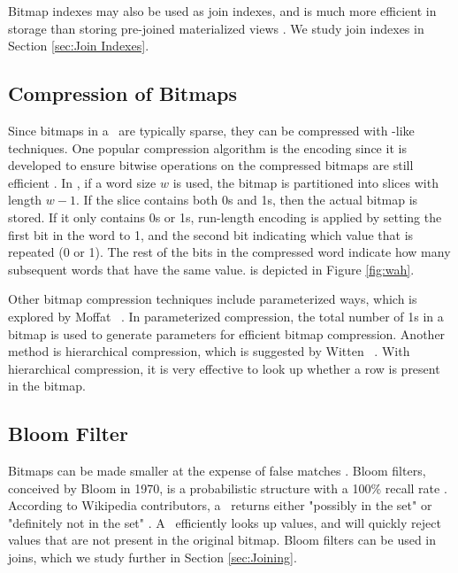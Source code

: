 Bitmap indexes may also be used as join indexes, and is much more efficient in storage than storing pre-joined materialized views \cite{noauthor_undated-hp}. We study join indexes in Section \ref{sec:Join Indexes}.


\subsection{Compression of Bitmaps}
\label{sub:Compression of Bitmaps}


Since bitmaps in a \biti~are typically sparse, they can be compressed with \rle-like techniques. One popular compression algorithm is the  encoding since it is developed to ensure bitwise operations on the compressed bitmaps are still efficient \cite{Bjorklund2011-wh}. In , if a word size $w$ is used, the bitmap is partitioned into slices with length $w-1$. If the slice contains both 0s and 1s, then the actual bitmap is stored. If it only contains 0s or 1s, run-length encoding is applied by setting the first bit in the word to 1, and the second bit indicating which value that is repeated (0 or 1). The rest of the bits in the compressed word indicate how many subsequent words that have the same value.  is depicted in Figure \ref{fig:wah}.

Other bitmap compression techniques include parameterized ways, which is explored by Moffat \ea~\cite{Moffat1992-tz}. In parameterized compression, the total number of 1s in a bitmap is used to generate parameters for efficient bitmap compression. Another method is hierarchical compression, which is suggested by Witten \ea~\cite{Witten1999-qq}. With hierarchical compression, it is very effective to look up whether a row is present in the bitmap.


\subsection{Bloom Filter}
\label{sub:Bloom Filter}
Bitmaps can be made smaller at the expense of false matches \cite{Witten1999-qq}. Bloom filters, conceived by Bloom in 1970, is a probabilistic structure with a 100\% recall rate \cite{Bloom1970-nr, Wikipedia_contributors2015-lq}. According to Wikipedia contributors, a \bloom~returns either "possibly in the set" or "definitely not in the set" \cite{Wikipedia_contributors2015-lq}. A \bloom~efficiently looks up values, and will quickly reject values that are not present in the original bitmap. Bloom filters can be used in joins, which we study further in Section \ref{sec:Joining}.

